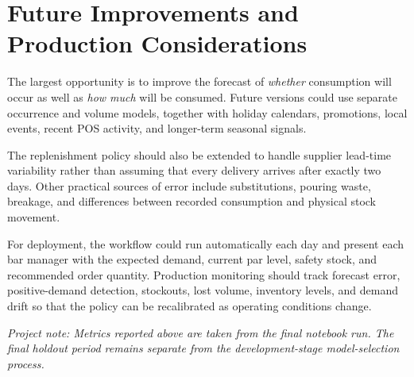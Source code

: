 \documentclass[11pt,a4paper]{article}
\begin{document}
\section{Future Improvements and Production Considerations}

The largest opportunity is to improve the forecast of \emph{whether} consumption will occur as well as \emph{how much} will be consumed. Future versions could use separate occurrence and volume models, together with holiday calendars, promotions, local events, recent POS activity, and longer-term seasonal signals.

The replenishment policy should also be extended to handle supplier lead-time variability rather than assuming that every delivery arrives after exactly two days. Other practical sources of error include substitutions, pouring waste, breakage, and differences between recorded consumption and physical stock movement.

For deployment, the workflow could run automatically each day and present each bar manager with the expected demand, current par level, safety stock, and recommended order quantity. Production monitoring should track forecast error, positive-demand detection, stockouts, lost volume, inventory levels, and demand drift so that the policy can be recalibrated as operating conditions change.

\vfill
\noindent{\color{rulegray}\rule{\textwidth}{0.6pt}}
\vspace{3pt}
\noindent\small\color{midgray}\textit{Project note: Metrics reported above are taken from the final notebook run. The final holdout period remains separate from the development-stage model-selection process.}
\end{document}

